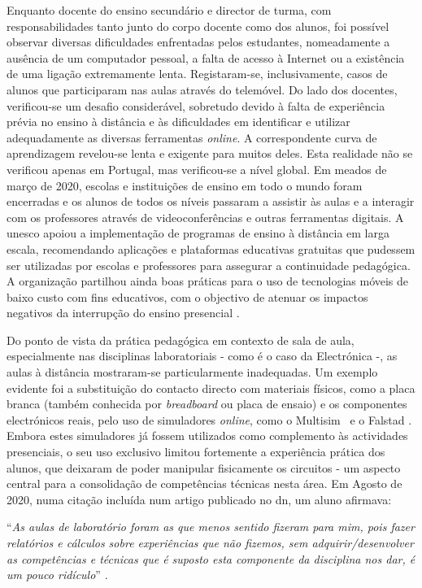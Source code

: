 Enquanto docente do ensino secundário e director de turma, com responsabilidades tanto junto do corpo docente como dos alunos, foi possível observar diversas dificuldades enfrentadas pelos estudantes, nomeadamente a ausência de um computador pessoal, a falta de acesso à Internet ou a existência de uma ligação extremamente lenta. Registaram-se, inclusivamente, casos de alunos que participaram nas aulas através do telemóvel. Do lado dos docentes, verificou-se um desafio considerável, sobretudo devido à falta de experiência prévia no ensino à distância e às dificuldades em identificar e utilizar adequadamente as diversas ferramentas \textit{online}. A correspondente curva de aprendizagem revelou-se lenta e exigente para muitos deles. Esta realidade não se verificou apenas em Portugal, mas verificou-se a nível global. Em meados de março de 2020, escolas e instituições de ensino em todo o mundo foram encerradas e os alunos de todos os níveis passaram a assistir às aulas e a interagir com os professores através de videoconferências e outras ferramentas digitais. A \acrfull{unesco} apoiou a implementação de programas de ensino à distância em larga escala, recomendando aplicações e plataformas educativas gratuitas que pudessem ser utilizadas por escolas e professores para assegurar a continuidade pedagógica. A organização partilhou ainda boas práticas para o uso de tecnologias móveis de baixo custo com fins educativos, com o objectivo de atenuar os impactos negativos da interrupção do ensino presencial \cite{unesco}. 

Do ponto de vista da prática pedagógica em contexto de sala de aula, especialmente nas disciplinas laboratoriais - como é o caso da Electrónica -, as aulas à distância mostraram-se particularmente inadequadas. Um exemplo evidente foi a substituição do contacto directo com materiais físicos, como a placa branca (também conhecida por \textit{breadboard} ou placa de ensaio) e os componentes electrónicos reais, pelo uso de simuladores \textit{online}, como o Multisim~\cite{multisim} e o Falstad \cite{falstad}. Embora estes simuladores já fossem utilizados como complemento às actividades presenciais, o seu uso exclusivo limitou fortemente a experiência prática dos alunos, que deixaram de poder manipular fisicamente os circuitos - um aspecto central para a consolidação de competências técnicas nesta área. Em Agosto de 2020, numa citação incluída num artigo publicado no \acrfull{dn}, um aluno afirmava:
\begin{center}
    ``\textit{As aulas de laboratório foram as que menos sentido fizeram para mim, pois fazer relatórios e cálculos sobre experiências que não fizemos, sem adquirir/desenvolver as competências e técnicas que é suposto esta componente da disciplina nos dar, é um pouco ridículo}'' \cite{impactonegativocovid}.
\end{center}

